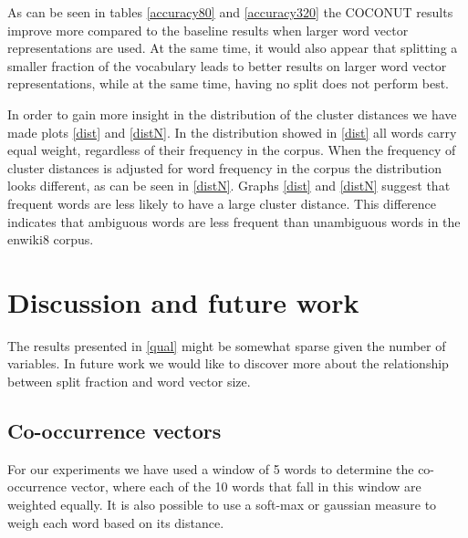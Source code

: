 \documentclass[11pt]{article}
\begin{document}
As can be seen in tables \ref{accuracy80} and \ref{accuracy320} the COCONUT results improve more compared to the baseline results when larger word vector representations are used. At the same time, it would also appear that splitting a smaller fraction of the vocabulary leads to better results on larger word vector representations, while at the same time, having no split does not perform best.

In order to gain more insight in the distribution of the cluster distances we have made plots \ref{dist} and \ref{distN}. In the distribution showed in \ref{dist} all words carry equal weight, regardless of their frequency in the corpus. When the frequency of cluster distances is adjusted for word frequency in the corpus the distribution looks different, as can be seen in \ref{distN}. Graphs \ref{dist} and \ref{distN} suggest that frequent words are less likely to have a large cluster distance. This difference indicates that ambiguous words are less frequent than unambiguous words in the enwiki8 corpus.

\section{Discussion and future work}
The results presented in \ref{qual} might be somewhat sparse given the number of variables. In future work we would like to discover more about the relationship between split fraction and word vector size.

\subsection{Co-occurrence vectors}
For our experiments we have used a window of 5 words to determine the co-occurrence vector, where each of the 10 words that fall in this window are weighted equally. It is also possible to use a soft-max or gaussian measure to weigh each word based on its distance.
\end{document}
